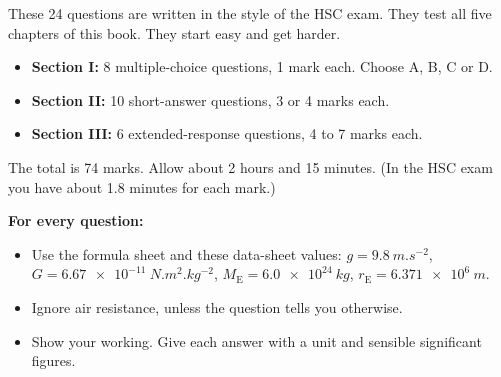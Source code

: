 \providecommand\pracmarks[1]{\hfill\mbox{\textcolor{hscmuted}{\small(#1)}}}
\providecommand\pracblank{\textcolor{hscmuted}{\rule[-2pt]{2.6em}{0.4pt}}}


These 24 questions are written in the style of the HSC exam. They test all five chapters of
this book. They start easy and get harder.
\begin{itemize}
  \item \textbf{Section I:} 8 multiple-choice questions, 1 mark each. Choose A, B, C or D.
  \item \textbf{Section II:} 10 short-answer questions, 3 or 4 marks each.
  \item \textbf{Section III:} 6 extended-response questions, 4 to 7 marks each.
\end{itemize}
The total is 74 marks. Allow about 2 hours and 15 minutes. (In the HSC exam you have about
1.8 minutes for each mark.)

\textbf{For every question:}
\begin{itemize}
  \item Use the formula sheet and these data-sheet values: $g = \qty{9.8}{m.s^{-2}}$,
        $G = \qty{6.67e-11}{N.m^2.kg^{-2}}$, $M_\mathrm{E} = \qty{6.0e24}{kg}$,
        $r_\mathrm{E} = \qty{6.371e6}{m}$.
  \item Ignore air resistance, unless the question tells you otherwise.
  \item Show your working. Give each answer with a unit and sensible significant figures.
\end{itemize}

